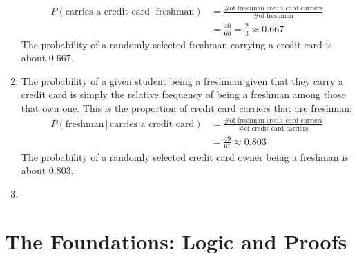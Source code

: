 \documentclass[12pt]{article}
\begin{document}
\begin{enumerate}
\begin{align*}
						P(\text{carries a credit card} \,|\, \text{freshman}) &= \frac{\text{\# of freshman credit card carriers}}{\text{\# of freshman}} \\
							&= \frac{40}{60}
								= \frac{2}{3}
								\approx 0.667
					\end{align*}
					The probability of a randomly selected freshman carrying a credit card is about 0.667.
			\item
				The probability of a given student being a freshman given that they carry a credit card is simply the relative frequency of being a freshman among those that own one. This is the proportion of credit card carriers that are freshman:
					\begin{align*}
						P(\text{freshman} \,|\, \text{carries a credit card}) &= \frac{\text{\# of freshman credit card carriers}}{\text{\# of credit card carriers}} \\
							&= \frac{49}{61}
								\approx 0.803
					\end{align*}
					The probability of a randomly selected credit card owner being a freshman is about 0.803.
			\item
				
		\end{enumerate}
	\setcounter{section}{0}
	\section{The Foundations: Logic and Proofs}
\end{document}
